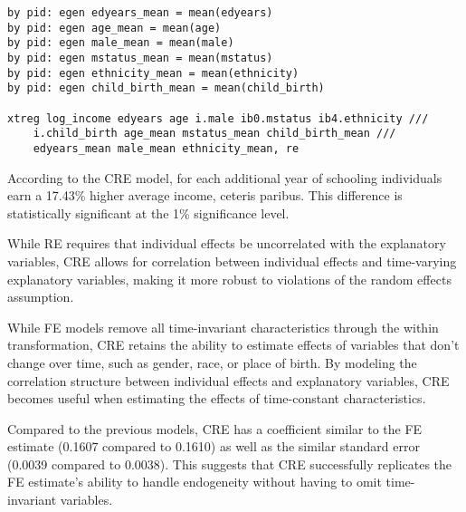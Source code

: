 

\begin{verbatim}
by pid: egen edyears_mean = mean(edyears)
by pid: egen age_mean = mean(age)
by pid: egen male_mean = mean(male)
by pid: egen mstatus_mean = mean(mstatus)
by pid: egen ethnicity_mean = mean(ethnicity)
by pid: egen child_birth_mean = mean(child_birth)

xtreg log_income edyears age i.male ib0.mstatus ib4.ethnicity ///
    i.child_birth age_mean mstatus_mean child_birth_mean ///
    edyears_mean male_mean ethnicity_mean, re
\end{verbatim}

According to the CRE model, for each additional year of schooling individuals earn a 17.43\% higher average income, ceteris paribus. This difference is statistically significant at the 1\% significance level.


While RE requires that individual effects be uncorrelated with the explanatory variables, CRE allows for correlation between individual effects and time-varying explanatory variables, making it more robust to violations of the random effects assumption.



While FE models remove all time-invariant characteristics through the within transformation, CRE retains the ability to estimate effects of variables that don't change over time, such as gender, race, or place of birth. By modeling the correlation structure between individual effects and explanatory variables, CRE becomes useful when estimating the effects of time-constant characteristics.


Compared to the previous models, CRE has a coefficient similar to the FE estimate (0.1607 compared to 0.1610) as well as the similar standard error (0.0039 compared to 0.0038). This suggests that CRE successfully replicates the FE estimate's ability to handle endogeneity without having to omit time-invariant variables.

